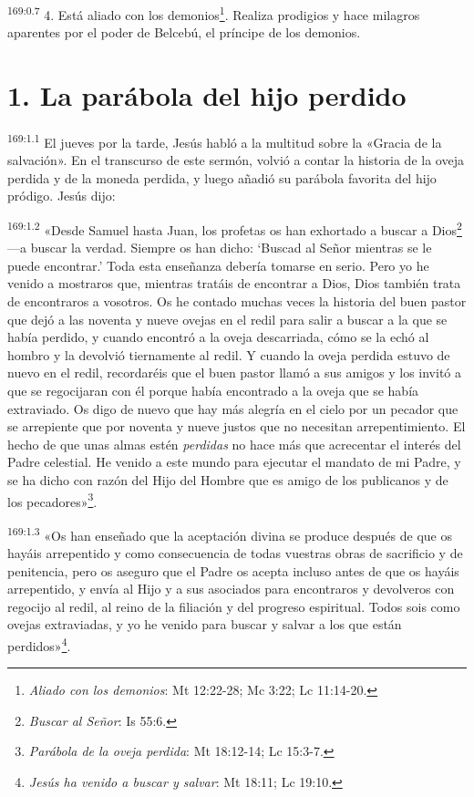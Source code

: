 \par 
\textsuperscript{169:0.7} 4. Está aliado con los demonios\footnote{\textit{Aliado con los demonios}: Mt 12:22-28; Mc 3:22; Lc 11:14-20.}. Realiza prodigios y hace milagros aparentes por el poder de Belcebú, el príncipe de los demonios.

\section*{1. La parábola del hijo perdido}
\par 
\textsuperscript{169:1.1} El jueves por la tarde, Jesús habló a la multitud sobre la «Gracia de la salvación». En el transcurso de este sermón, volvió a contar la historia de la oveja perdida y de la moneda perdida, y luego añadió su parábola favorita del hijo pródigo. Jesús dijo:

\par 
\textsuperscript{169:1.2} «Desde Samuel hasta Juan, los profetas os han exhortado a buscar a Dios\footnote{\textit{Buscar al Señor}: Is 55:6.} ---a buscar la verdad. Siempre os han dicho: `Buscad al Señor mientras se le puede encontrar.' Toda esta enseñanza debería tomarse en serio. Pero yo he venido a mostraros que, mientras tratáis de encontrar a Dios, Dios también trata de encontraros a vosotros. Os he contado muchas veces la historia del buen pastor que dejó a las noventa y nueve ovejas en el redil para salir a buscar a la que se había perdido, y cuando encontró a la oveja descarriada, cómo se la echó al hombro y la devolvió tiernamente al redil. Y cuando la oveja perdida estuvo de nuevo en el redil, recordaréis que el buen pastor llamó a sus amigos y los invitó a que se regocijaran con él porque había encontrado a la oveja que se había extraviado. Os digo de nuevo que hay más alegría en el cielo por un pecador que se arrepiente que por noventa y nueve justos que no necesitan arrepentimiento. El hecho de que unas almas estén \textit{perdidas} no hace más que acrecentar el interés del Padre celestial. He venido a este mundo para ejecutar el mandato de mi Padre, y se ha dicho con razón del Hijo del Hombre que es amigo de los publicanos y de los pecadores»\footnote{\textit{Parábola de la oveja perdida}: Mt 18:12-14; Lc 15:3-7.}.

\par 
\textsuperscript{169:1.3} «Os han enseñado que la aceptación divina se produce después de que os hayáis arrepentido y como consecuencia de todas vuestras obras de sacrificio y de penitencia, pero os aseguro que el Padre os acepta incluso antes de que os hayáis arrepentido, y envía al Hijo y a sus asociados para encontraros y devolveros con regocijo al redil, al reino de la filiación y del progreso espiritual. Todos sois como ovejas extraviadas, y yo he venido para buscar y salvar a los que están perdidos»\footnote{\textit{Jesús ha venido a buscar y salvar}: Mt 18:11; Lc 19:10.}.

